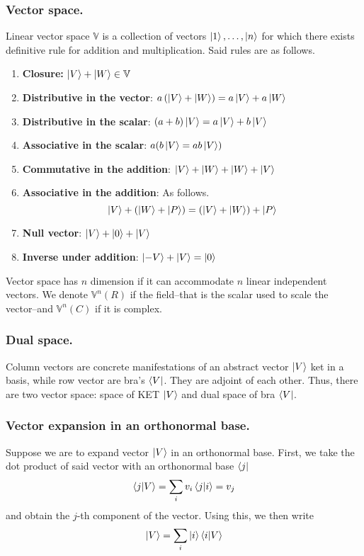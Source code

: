 \documentclass[../main.tex]{subfiles}
\begin{document}
\subsubsection*{Vector space.}
Linear vector space $\mathbb{V}$ is a collection of vectors $\ket{1},\dots,\ket{n}$ for which there exists definitive rule for addition and multiplication.
Said rules are as follows.
\begin{enumerate}
	\item \textbf{Closure:} $\ket{V}+\ket{W}\in \mathbb{V}$
	\item \textbf{Distributive in the vector}: $a\left(\ket{V}+\ket{W}\right)=a\ket{V}+a \ket{W}$
	\item \textbf{Distributive in the scalar}: $(a+b)\ket{V}=a \ket{V}+b \ket{V}$
	\item \textbf{Associative in the scalar}: $a(b\ket{V}=ab\ket{V})$
	\item \textbf{Commutative in the addition}: $\ket{V}+\ket{W}+\ket{W}+\ket{V}$
	\item \textbf{Associative in the addition}: As follows.
	      \begin{equation*}
		      \ket{V}+\left(\ket{W}+\ket{P}\right)=\left(\ket{V}+\ket{W}\right)+\ket{P}
	      \end{equation*}
	\item \textbf{Null vector}: $\ket{V}+\ket{0}+\ket{V}$
	\item \textbf{Inverse under addition}: $\ket{-V}+\ket{V}=\ket{0}$
\end{enumerate}

Vector space has $n$ dimension if it can accommodate $n$ linear independent vectors.
We denote $\mathbb{V}^n(R)$ if the field--that is the scalar used to scale the vector--and $\mathbb{V}^n(C)$ if it is complex.

\subsubsection*{Dual space.}
Column vectors are concrete manifestations of an abstract vector $\ket{V}$ ket in a basis, while row vector are bra's $\bra{V}$.
They are adjoint of each other.
Thus, there are two vector space: space of KET $\ket{V}$ and dual space of bra $\bra{V}$.

\subsubsection*{Vector expansion in an orthonormal base.}
Suppose we are to expand vector $\ket{V}$ in an  orthonormal base.
First, we take the dot product of said vector with an orthonormal base $\bra{j}$
\begin{equation*}
	\braket{j|V}=\sum_i v_i\braket{j|i}=v_j
\end{equation*}
and obtain the $j$-th component of the vector.
Using this, we then write
\begin{equation*}
	\ket{V}=\sum_i \ket{i}\braket{i|V}
\end{equation*}
\end{document}

